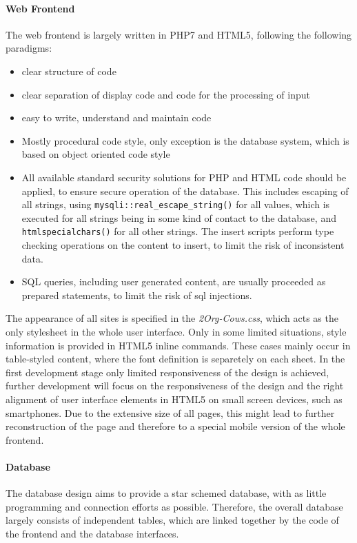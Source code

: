 \paragraph{Web Frontend}
The web frontend is largely written in PHP7 and HTML5, following the following paradigms: 
\begin{itemize}
 \item clear structure of code
 \item clear separation of display code and code for the processing of input
 \item easy to write, understand and maintain code
 \item Mostly procedural code style, only exception is the database system, which is based on object oriented code style
 \item All available standard security solutions for PHP and HTML code should be applied, to ensure secure operation of the database. This includes escaping of all strings, using 
 \texttt{mysqli::real\_escape\_string()} for all values, which is executed for all strings being in some kind of contact to the database, and \texttt{htmlspecialchars()} for all other strings. 
 The insert scripts perform type checking operations on the content to insert, to limit the risk of inconsistent data.
 \item SQL queries, including user generated content, are usually proceeded as prepared statements, to limit the risk of sql injections.
\end{itemize}
The appearance of all sites is specified in the \emph{2Org-Cows.css}, which acts as the only stylesheet in the whole user interface. Only in some limited situations, style information is 
provided in HTML5 inline commands. These cases mainly occur in table-styled content, where the font definition is separetely on each sheet.  
In the first development stage only limited responsiveness of the design is achieved, further development will focus on the responsiveness of the design
and the right alignment of user interface elements in HTML5 on small screen devices, such as smartphones. Due to the extensive size of all pages, this might lead to further 
reconstruction of the page and therefore to a special mobile version of the whole frontend.
\paragraph{Database}
The database design aims to provide a star schemed database, with as little programming and connection efforts as possible. Therefore, the overall database largely consists of 
independent tables, which are linked together by the code of the frontend and the database interfaces.
